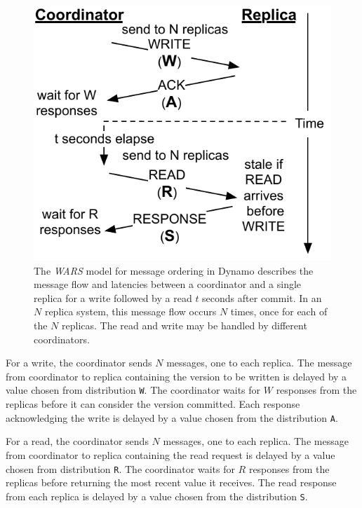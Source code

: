 \documentclass{vldb}
\begin{document}
\begin{figure}
\centering
\includegraphics[width=.8\columnwidth]{figs/dynamostale.pdf}
\vspace{-8pt}
\caption{The \textit{WARS} model for message ordering in Dynamo
  describes the message flow and latencies between a coordinator and a
  single replica for a write followed by a read $t$ seconds after
  commit.  In an $N$ replica system, this message flow occurs $N$
  times, once for each of the $N$ replicas.  The read and write may be
  handled by different coordinators.}
\vspace{-12pt}
\label{fig:dynamo-diagram}
\end{figure}

For a write, the coordinator sends $N$ messages, one to each
replica. The message from coordinator to replica containing the
version to be written is delayed by a value chosen from distribution
\texttt{W}.  The coordinator waits for $W$ responses from the replicas
before it can consider the version committed.  Each response
acknowledging the write is delayed by a value chosen from the
distribution \texttt{A}.

For a read, the coordinator sends $N$ messages, one to each replica.
The message from coordinator to replica containing the read request is
delayed by a value chosen from distribution \texttt{R}.  The
coordinator waits for $R$ responses from the replicas before returning
the most recent value it receives.  The read response from each
replica is delayed by a value chosen from the distribution \texttt{S}.
\end{document}
